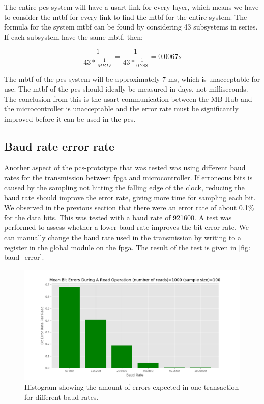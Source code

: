 \documentclass[main.tex]{subfiles}
\begin{document}
The entire \gls{pcs}-system will have a \gls{usart}-link for every layer, which means we have to consider the \gls{mtbf} for every link to find the \gls{mtbf} for the entire system. The formula for the system \gls{mtbf} can be found by considering 43 subsystems in series\cite{mtbf_calc}. If each subsystem have the same \gls{mbtf}, then:

\begin{equation}
    \frac{1}{43*\frac{1}{MBTF}} = \frac{1}{43*\frac{1}{0.288}} = 0.0067s
\end{equation}

The \gls{mbtf} of the \gls{pcs}-system will be approximately 7 ms, which is unacceptable for use. The \gls{mtbf} of the \gls{pcs} should ideally be measured in days, not milliseconds. The conclusion from this is the \gls{usart} communication between the MB Hub and the microcontroller is unacceptable and the error rate must be significantly improved before it can be used in the \gls{pcs}.



\subsection{Baud rate error rate}

Another aspect of the \gls{pcs}-prototype that was tested was using different baud rates for the transmission between \gls{fpga} and microcontroller. If erroneous bits is caused by the sampling not hitting the falling edge of the clock, reducing the baud rate should improve the error rate, giving more time for sampling each bit. We observed in the previous section that there were an error rate of about 0.1\% for the data bits. This was tested with a baud rate of 921600. A test was performed to assess whether a lower baud rate improves the bit error rate. We can manually change the baud rate used in the transmission by writing to a register in the global module on the \gls{fpga}. The result of the test is given in \autoref{fig: baud_error}.

\begin{figure}[!ht]
    \centering
    \includegraphics[width=18cm]{images/baud_error_rate.png}
    \caption{Histogram showing the amount of errors expected in one transaction for different baud rates.}
    \label{fig: baud_error}
\end{figure}
\FloatBarrier
\end{document}

